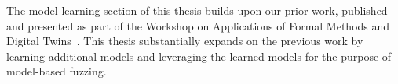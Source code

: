 The model-learning section of this thesis builds upon our prior work, published and presented as part of the Workshop on Applications of
Formal Methods and Digital Twins~\cite{shortpaper}. This thesis substantially expands on the previous work by learning additional models and leveraging the learned models for the purpose of model-based fuzzing.

